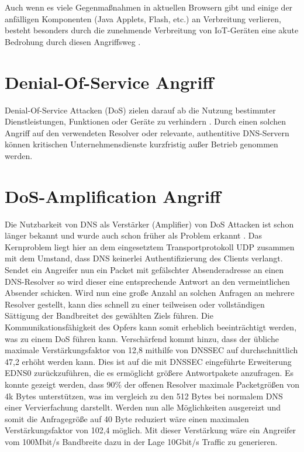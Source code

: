 Auch wenn es viele Gegenmaßnahmen in aktuellen Browsern gibt und einige der anfälligen Komponenten (Java Applets, Flash, etc.) an Verbreitung verlieren, besteht besonders durch die zunehmende Verbreitung von IoT-Geräten eine akute Bedrohung durch diesen Angriffsweg \cite{Dorsey2018}. 

\section{Denial-Of-Service Angriff}


Denial-Of-Service Attacken (DoS) zielen darauf ab die Nutzung bestimmter Dienstleistungen, Funktionen oder Geräte zu verhindern \cite{BSIG040}. Durch einen solchen Angriff auf den verwendeten Resolver oder relevante, authentitive DNS-Servern können kritischen Unternehmensdienste kurzfristig außer Betrieb genommen werden.  

\section{DoS-Amplification Angriff}
\label{sec:attack-dosamp}

Die Nutzbarkeit von DNS als Verstärker (Amplifier) von DoS Attacken ist schon länger bekannt und wurde auch schon früher als Problem erkannt \cite{ICANN2006}. Das Kernproblem liegt hier an dem eingesetztem Transportprotokoll UDP zusammen mit dem Umstand, dass DNS keinerlei Authentifizierung des Clients verlangt. Sendet ein Angreifer nun ein Packet mit gefälschter Absenderadresse an einen DNS-Resolver so wird dieser eine entsprechende Antwort an den vermeintlichen Absender schicken. Wird nun eine große Anzahl an solchen Anfragen an mehrere Resolver gestellt, kann dies schnell zu einer teilweisen oder vollständigen Sättigung der Bandbreitet des gewählten Ziels führen. Die Kommunikationsfähigkeit des Opfers kann somit erheblich beeinträchtigt werden, was zu einem DoS führen kann. 
Verschärfend kommt hinzu, dass der übliche maximale Verstärkungsfaktor von 12,8 mithilfe von DNSSEC auf durchschnittlich 47,2 erhöht werden kann. Dies ist auf die mit DNSSEC eingeführte Erweiterung EDNS0 zurückzuführen, die es ermöglicht größere Antwortpakete anzufragen. Es konnte gezeigt werden, dass 90\% der offenen Resolver maximale Packetgrößen von 4k Bytes unterstützen, was im vergleich zu den 512 Bytes bei normalem DNS einer Vervierfachung darstellt. Werden nun alle Möglichkeiten ausgereizt und somit die Anfragegröße auf 40 Byte reduziert wäre einen maximalen Verstärkungsfaktor von 102,4 möglich\cite{VanRijswijk-Deij2014}. Mit dieser Verstärkung wäre ein Angreifer vom 100Mbit/s Bandbreite dazu in der Lage 10Gbit/s Traffic zu generieren.


